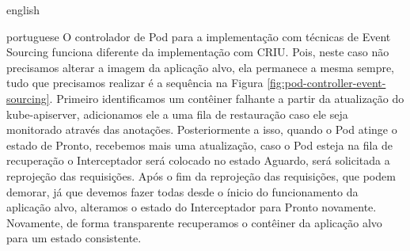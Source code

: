 \begin{otherlanguage*}{english}
\begin{otherlanguage*}{portuguese}
O controlador de Pod para a implementação com técnicas de Event Sourcing funciona
diferente da implementação com CRIU. Pois, neste caso não precisamos alterar a imagem da
aplicação alvo, ela permanece a mesma sempre, tudo que precisamos realizar é a sequência
na Figura \ref{fig:pod-controller-event-sourcing}. Primeiro identificamos um contêiner
falhante a partir da atualização do kube-apiserver, adicionamos ele a uma fila de
restauração caso ele seja monitorado através das anotações. Posteriormente a isso, quando
o Pod atinge o estado de Pronto, recebemos mais uma atualização, caso o Pod esteja na
fila de recuperação o Interceptador será colocado no estado Aguardo, será solicitada a
reprojeção das requisições. Após o fim da reprojeção das requisições, que podem demorar,
já que devemos fazer todas desde o ínicio do funcionamento da aplicação alvo, alteramos
o estado do Interceptador para Pronto novamente. Novamente, de forma transparente
recuperamos o contêiner da aplicação alvo para um estado consistente.


\end{otherlanguage*}
\end{otherlanguage*}

